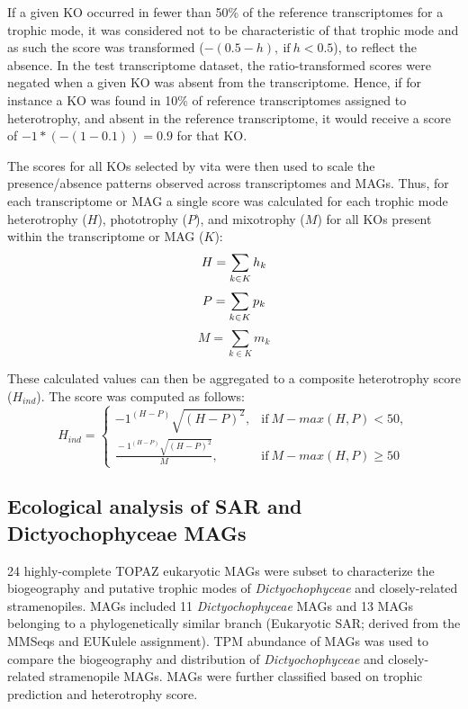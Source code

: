 \documentclass[12pt]{article}
\numberwithin{equation}{section}
\begin{document}
If  a given KO occurred in fewer than 50\% of the reference transcriptomes for a trophic mode, it was considered not to be characteristic of that trophic mode and as such the score was transformed ($-(0.5 - h),\ \text{if} \ h<0.5$), to reflect the absence. In the test transcriptome dataset, the ratio-transformed scores were negated when a given KO was absent from the transcriptome. Hence, if for instance a KO was found in 10\% of reference transcriptomes assigned to heterotrophy, and absent in the reference transcriptome, it would receive a score of $-1 * (-(1-0.1)) = 0.9$ for that KO.

The scores for all KOs selected by vita were then used to scale the presence/absence patterns observed across transcriptomes and MAGs. Thus, for each transcriptome or MAG a single score was calculated for each trophic mode heterotrophy ($H$), phototrophy ($P$), and mixotrophy ($M$) for all KOs present within the transcriptome or MAG ($K$):
  \begin{equation}\label{eq:sum}
  H = \sum_{k \in K} h_k \\ 
  \end{equation}
  \begin{equation}
    P = \sum_{k \in K} p_k \\
\end{equation}
  \begin{equation}
    M = \sum_{k \in K} m_k
\end{equation}

These calculated values can then be aggregated to a composite heterotrophy score ($H_{ind}$). The score was computed as follows: 
\begin{equation}\label{eq:hind}
  H_{ind}=
    \begin{cases}
      -1^{(H-P)}\sqrt{(H-P)^2}, & \text{if}\ M-max(H,P)<50, \\
      \frac{{}-1^{(H-P)}\sqrt{(H-P)^2}}{M}, & \text{if} \ M-max(H,P) \geq 50
    \end{cases}
  \end{equation}
  
\subsection*{Ecological analysis of SAR and Dictyochophyceae MAGs}
24 highly-complete TOPAZ eukaryotic MAGs were subset to characterize the biogeography and putative trophic modes of \emph{Dictyochophyceae} and closely-related stramenopiles. MAGs included 11 \emph{Dictyochophyceae} MAGs and 13 MAGs belonging to a phylogenetically similar branch (Eukaryotic SAR; derived from the MMSeqs and EUKulele assignment). TPM abundance of MAGs was used to compare the biogeography and distribution of \emph{Dictyochophyceae} and closely-related stramenopile MAGs. MAGs were further classified based on trophic prediction and heterotrophy score. 
\end{document}
